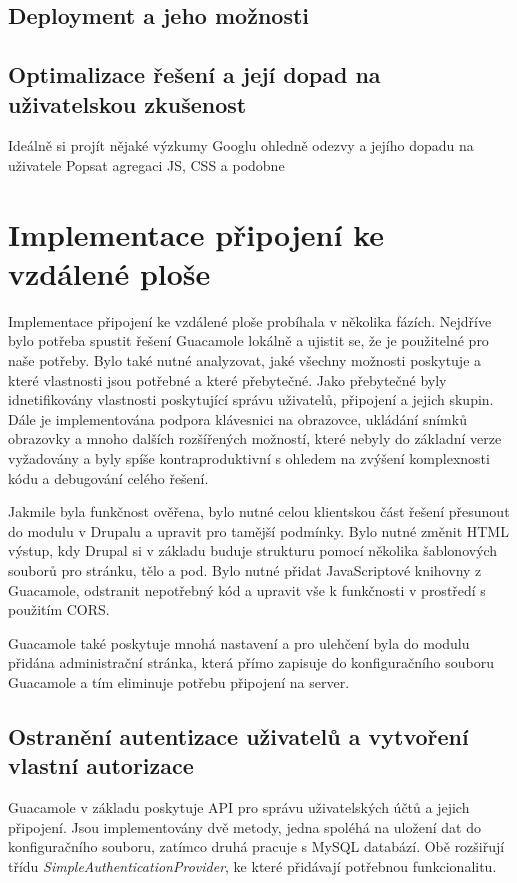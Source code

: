 \section{Deployment a jeho možnosti}

\section{Optimalizace řešení a její dopad na uživatelskou zkušenost}
Ideálně si projít nějaké výzkumy Googlu ohledně odezvy a jejího dopadu na uživatele
Popsat agregaci JS, CSS a podobne 
\cite{website:drupal:optimizing}

\chapter{Implementace připojení ke vzdálené ploše}
\label{chap:implementace-guacamole}
Implementace připojení ke vzdálené ploše probíhala v několika fázích. Nejdříve bylo potřeba spustit řešení Guacamole lokálně a ujistit se, že je použitelné pro naše potřeby. Bylo také nutné analyzovat, jaké všechny možnosti poskytuje a které vlastnosti jsou potřebné a které přebytečné. Jako přebytečné byly idnetifikovány vlastnosti poskytující správu uživatelů, připojení a jejich skupin. Dále je implementována podpora klávesnici na obrazovce, ukládání snímků obrazovky a mnoho dalších rozšířených možností, které nebyly do základní verze vyžadovány a byly spíše kontraproduktivní s ohledem na zvýšení komplexnosti kódu a debugování celého řešení. 

Jakmile byla funkčnost ověřena, bylo nutné celou klientskou část řešení přesunout do modulu v Drupalu a upravit pro tamější podmínky. Bylo nutné změnit HTML výstup, kdy Drupal si v základu buduje strukturu pomocí několika šablonových souborů pro stránku, tělo a pod. Bylo nutné přidat JavaScriptové knihovny z Guacamole, odstranit nepotřebný kód a upravit vše k funkčnosti v prostředí s použitím CORS. 

Guacamole také poskytuje mnohá nastavení a pro ulehčení byla do modulu přidána administrační stránka, která přímo zapisuje do konfiguračního souboru Guacamole a tím eliminuje potřebu připojení na server. 

\section{Ostranění autentizace uživatelů a vytvoření vlastní autorizace}
Guacamole v základu poskytuje API pro správu uživatelských účtů a jejich připojení. Jsou implementovány dvě metody, jedna spoléhá na uložení dat do konfiguračního souboru, zatímco druhá pracuje s MySQL databází. Obě rozšiřují třídu \emph{SimpleAuthenticationProvider}, ke které přidávají potřebnou funkcionalitu. 

